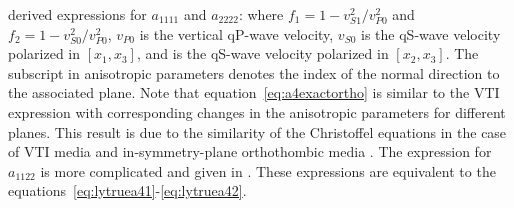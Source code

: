 \cite{alortho} derived  expressions for $a_{1111}$ and $a_{2222}$:
where  $f_1 =  1-v^2_{S1}/v^2_{P0}$ and $f_2 =  1-v^2_{S0}/v^2_{P0}$, $v_{P0}$ is the vertical qP-wave velocity, $v_{S0}$ is the qS-wave velocity polarized in ${[x_1,x_3]}$, and   is the qS-wave velocity polarized in ${[x_2,x_3]}$. The subscript in anisotropic parameters denotes the index of the normal direction to the associated plane. Note that equation~\ref{eq:a4exactortho} is similar to the VTI expression with corresponding changes in the anisotropic parameters for different planes. This result is due to the similarity of the Christoffel equations in the case of VTI media and in-symmetry-plane orthothombic media \cite[]{tsvankinbook}. The expression for $a_{1122}$ is more complicated and  given in \cite{alortho}. These expressions are equivalent to the equations~\ref{eq:lytruea41}-\ref{eq:lytruea42}.

